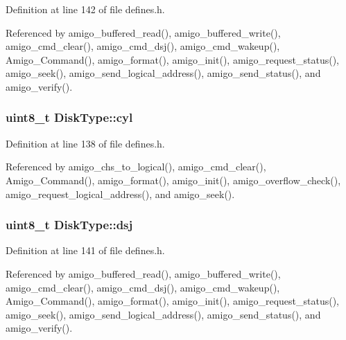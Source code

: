 Definition at line 142 of file defines.\+h.



Referenced by amigo\+\_\+buffered\+\_\+read(), amigo\+\_\+buffered\+\_\+write(), amigo\+\_\+cmd\+\_\+clear(), amigo\+\_\+cmd\+\_\+dsj(), amigo\+\_\+cmd\+\_\+wakeup(), Amigo\+\_\+\+Command(), amigo\+\_\+format(), amigo\+\_\+init(), amigo\+\_\+request\+\_\+status(), amigo\+\_\+seek(), amigo\+\_\+send\+\_\+logical\+\_\+address(), amigo\+\_\+send\+\_\+status(), and amigo\+\_\+verify().

\subsubsection[{\texorpdfstring{cyl}{cyl}}]{\setlength{\rightskip}{0pt plus 5cm}uint8\+\_\+t Disk\+Type\+::cyl}\hypertarget{structDiskType_a990d2a05bc2d8bf1328d0249202539e5}{}\label{structDiskType_a990d2a05bc2d8bf1328d0249202539e5}


Definition at line 138 of file defines.\+h.



Referenced by amigo\+\_\+chs\+\_\+to\+\_\+logical(), amigo\+\_\+cmd\+\_\+clear(), Amigo\+\_\+\+Command(), amigo\+\_\+format(), amigo\+\_\+init(), amigo\+\_\+overflow\+\_\+check(), amigo\+\_\+request\+\_\+logical\+\_\+address(), and amigo\+\_\+seek().

\subsubsection[{\texorpdfstring{dsj}{dsj}}]{\setlength{\rightskip}{0pt plus 5cm}uint8\+\_\+t Disk\+Type\+::dsj}\hypertarget{structDiskType_ad89ac2f4b87d861ae4ca3f185868b7da}{}\label{structDiskType_ad89ac2f4b87d861ae4ca3f185868b7da}


Definition at line 141 of file defines.\+h.



Referenced by amigo\+\_\+buffered\+\_\+read(), amigo\+\_\+buffered\+\_\+write(), amigo\+\_\+cmd\+\_\+clear(), amigo\+\_\+cmd\+\_\+dsj(), amigo\+\_\+cmd\+\_\+wakeup(), Amigo\+\_\+\+Command(), amigo\+\_\+format(), amigo\+\_\+init(), amigo\+\_\+request\+\_\+status(), amigo\+\_\+seek(), amigo\+\_\+send\+\_\+logical\+\_\+address(), amigo\+\_\+send\+\_\+status(), and amigo\+\_\+verify().

